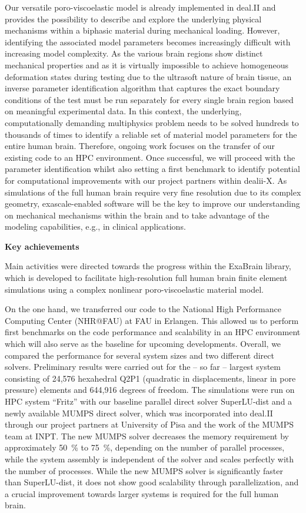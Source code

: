 \documentclass[a4paper,12pt, numbers]{article}
\begin{document}
Our versatile poro-viscoelastic model is already implemented in deal.II and provides the possibility to describe and explore the underlying physical mechanisms within a biphasic material during mechanical loading.
However, identifying the associated model parameters becomes increasingly difficult with increasing model complexity.
As the various brain regions show distinct mechanical properties and as it is virtually impossible to achieve homogeneous deformation states during testing due to the ultrasoft nature of brain tissue, an inverse parameter identification algorithm that captures the exact boundary conditions of the test must be run separately for every single brain region based on meaningful experimental data.
In this context, the underlying, computationally demanding multiphysics problem needs to be solved hundreds to thousands of times to identify a reliable set of material model parameters for the entire human brain.
Therefore, ongoing work focuses on the transfer of our existing code to an HPC environment.
Once successful, we will proceed with the parameter identification whilst also setting a first benchmark to identify potential for computational improvements with our project partners within dealii-X.
As simulations of the full human brain require very fine resolution due to its complex geometry, exascale-enabled software will be the key to improve our understanding on mechanical mechanisms within the brain and to take advantage of the modeling capabilities, e.g., in clinical applications.

\noindent\textbf{Key achievements}

Main activities were directed towards the progress within the ExaBrain library, which is developed to facilitate high-resolution full human brain finite element simulations using a complex nonlinear poro-viscoelastic material model.

On the one hand, we transferred our code to the National High Performance Computing Center (NHR@FAU) at FAU in Erlangen. This allowed us to perform first benchmarks on the code performance and scalability in an HPC environment which will also serve as the baseline for upcoming developments. Overall, we compared the performance for several system sizes and two different direct solvers. Preliminary results were carried out for the -- so far -- largest system consisting of 24,576 hexahedral Q2P1 (quadratic in displacements, linear in pore pressure) elements and 644,916 degrees of freedom. The simulations were run on HPC system ``Fritz'' with our baseline parallel direct solver SuperLU-dist and a newly available MUMPS direct solver, which was incorporated into deal.II through our project partners at University of Pisa and the work of the MUMPS team at INPT. The new MUMPS solver decreases the memory requirement by approximately \SI{50}{\percent} to \SI{75}{\percent}, depending on the number of parallel processes, while the system assembly is independent of the solver and scales perfectly with the number of processes.  While the new MUMPS solver is significantly faster than SuperLU-dist, it does not show good scalability through parallelization, and a crucial improvement towards larger systems is required for the full human brain.
\end{document}
